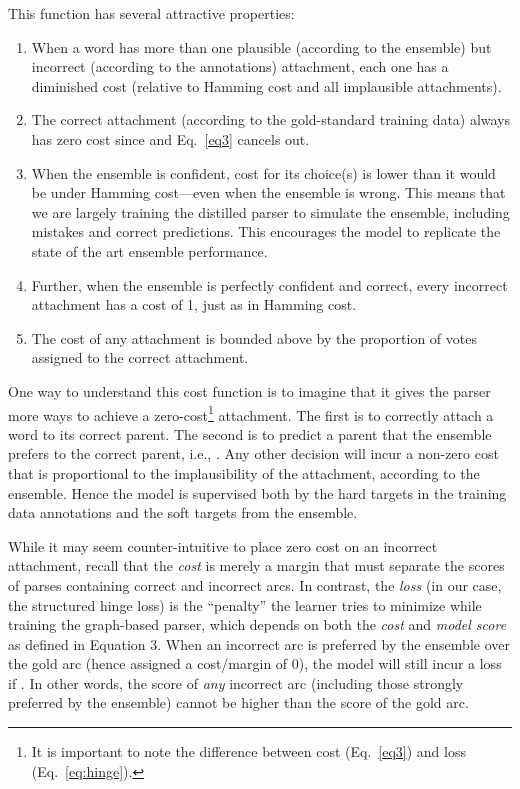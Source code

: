 \documentclass[11pt,letterpaper]{article}
\newcommand{\ignore}[1]{}
\newcommand{\nascomment}[1]{\ignore{\textcolor{blue}{{\textbf{[#1 --\textsc{nas}]}}}}}
\begin{document}
This function has several attractive properties:
\begin{enumerate}
\item When a word  has more than one plausible (according to the ensemble) but incorrect (according to the annotations) attachment, each one has a diminished cost (relative to Hamming cost and all implausible attachments).
\item The correct attachment (according to the gold-standard training data) always has zero cost since  and Eq.~\ref{eq3} cancels out. \ignore{\nascomment{I may have misunderstood what you wrote}}
\item When the ensemble is confident, cost for its choice(s) is lower than it would be under Hamming cost---even when the ensemble is wrong.  This means that we are largely training the distilled parser to simulate the ensemble, including mistakes and correct predictions. This encourages the model to replicate the state of the art ensemble performance.
\item Further, when the ensemble is perfectly confident and correct, every incorrect attachment  has a cost of 1, just as in Hamming cost.
\item The cost of any attachment is bounded above by the proportion of votes assigned to the correct attachment.  \ignore{\nascomment{check}}
\end{enumerate}




One way to understand this cost function is to imagine that it gives the parser more ways to achieve a zero-cost\footnote{It is important to note the difference between cost (Eq.~\ref{eq3}) and loss (Eq.~\ref{eq:hinge}).} attachment.  The first is to correctly attach a word to its correct parent.  The second is to predict a parent that the ensemble prefers to the correct parent, i.e.,
. Any other decision will incur a non-zero cost that is proportional to the implausibility of the attachment, according to the ensemble. Hence the model is supervised both by the hard targets in the training data annotations and the soft targets from the ensemble.

While it may seem counter-intuitive to place zero cost on an incorrect attachment, recall that the \emph{cost} is merely a margin that must separate the scores of parses containing correct and incorrect arcs. In contrast, the \emph{loss} (in our case, the structured hinge loss) is the “penalty” the learner tries to minimize while training the graph-based parser, which depends on both the \emph{cost} and \emph{model score} as defined in Equation 3. When an incorrect arc is preferred by the ensemble over the gold arc (hence assigned a cost/margin of 0), the model will still incur a loss if . In other words, the score of \emph{any} incorrect arc (including those strongly preferred by the ensemble) cannot be higher than the score of the gold arc. 
\end{document}
